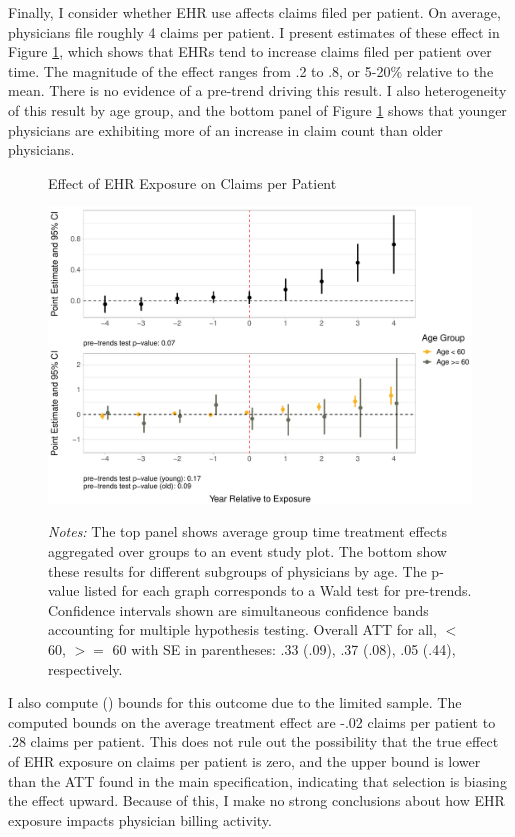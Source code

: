 \documentclass[12pt]{article}
\begin{document}
Finally, I consider whether EHR use affects claims filed per patient. On average, physicians file roughly 4 claims per patient. I present estimates of these effect in Figure \ref{fig:claim}, which shows that EHRs tend to increase claims filed per patient over time. The magnitude of the effect ranges from .2 to .8, or 5-20\% relative to the mean. There is no evidence of a pre-trend driving this result. I also heterogeneity of this result by age group, and the bottom panel of Figure \ref{fig:claim} shows that younger physicians are exhibiting more of an increase in claim count than older physicians.      

\begin{figure}[ht]
    \centering
    \captionsetup{width=.85\linewidth}
    \caption{Effect of EHR Exposure on Claims per Patient}
    \includegraphics[scale=.6]{Objects/claim_per_patient_plot.pdf}
    \label{fig:claim}
    \vspace{2mm}
    \caption*{\footnotesize{\textit{Notes:} The top panel shows average group time treatment effects aggregated over groups to an event study plot. The bottom show these results for different subgroups of physicians by age. The p-value listed for each graph corresponds to a Wald test for pre-trends. Confidence intervals shown are simultaneous confidence bands accounting for multiple hypothesis testing. Overall ATT for all, $<$ 60, $>=$ 60 with SE in parentheses: .33 (.09), .37 (.08), .05 (.44), respectively.}}
\end{figure}

I also compute \citeauthor{lee2009training} (\citeyear{lee2009training}) bounds for this outcome due to the limited sample. The computed bounds on the average treatment effect are -.02 claims per patient to .28 claims per patient. This does not rule out the possibility that the true effect of EHR exposure on claims per patient is zero,  and the upper bound is lower than the ATT found in the main specification, indicating that selection is biasing the effect upward. Because of this, I make no strong conclusions about how EHR exposure impacts physician billing activity. 
\end{document}

